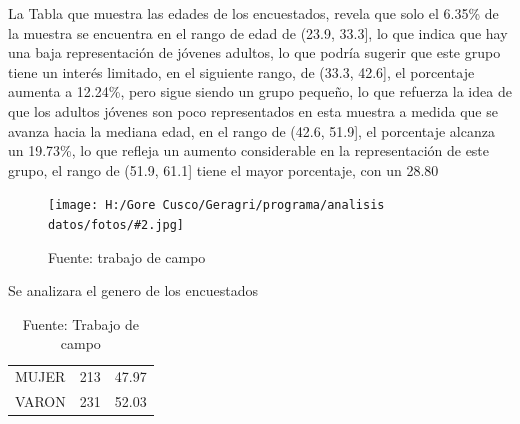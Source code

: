 \documentclass{article}\usepackage[]{graphicx}\usepackage[table]{xcolor}
\newenvironment{fotos}[2]
{\begin{figure}[H]
	\centering
	\caption{#1}
	\texttt{[image: H:/Gore Cusco/Geragri/programa/analisis datos/fotos/\#2.jpg]}
	\caption*{Fuente: trabajo de campo}}
{\end{figure}}
\begin{document}
La Tabla que muestra las edades de los encuestados, revela que solo el 6.35\% de la muestra se encuentra en el rango de edad de (23.9, 33.3], lo que indica que hay una baja representación de jóvenes adultos, lo que podría sugerir que este grupo tiene un interés limitado, en el siguiente rango, de (33.3, 42.6], el porcentaje aumenta a 12.24\%, pero sigue siendo un grupo pequeño, lo que refuerza la idea de que los adultos jóvenes son poco representados en esta muestra a medida que se avanza hacia la mediana edad, en el rango de (42.6, 51.9], el porcentaje alcanza un 19.73\%, lo que refleja un aumento considerable en la representación de este grupo, el rango de (51.9, 61.1] tiene el mayor porcentaje, con un 28.80%

\begin{fotos}
{Aplicacion de encuestas}{1}
\end{fotos}


Se analizara el genero de los encuestados
\begin{table}[H]
  \centering
  \caption{Genero de los encuestados}

\begin{tabular}{lcl}
\toprule
\cellcolor[HTML]{87A96B}{\textcolor{black}{\textbf{GENERO}}} & \cellcolor[HTML]{87A96B}{\textcolor{black}{\textbf{Conteo}}} & \cellcolor[HTML]{87A96B}{\textcolor{black}{\textbf{Porcentaje}}}\\
\midrule
MUJER & 213 & 47.97\\
VARON & 231 & 52.03\\
\bottomrule
\end{tabular}

  \caption*{Fuente: Trabajo de campo}
\end{table}  
\end{document}
